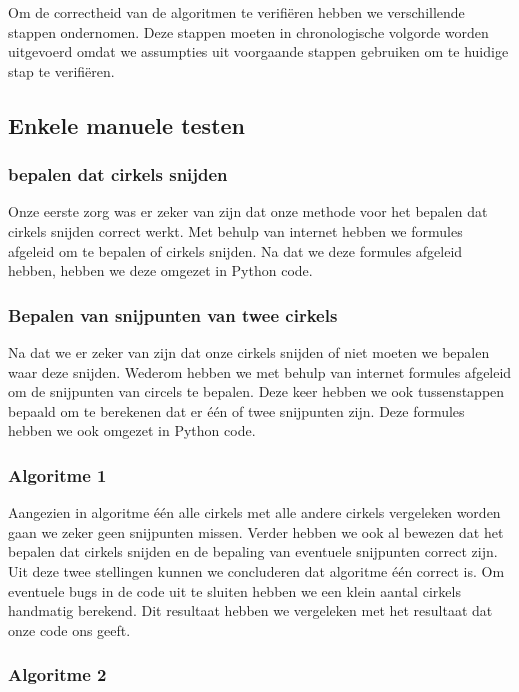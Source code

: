 \documentclass[11pt,a4paper]{article}
\begin{document}
Om de correctheid van de algoritmen te verifi\"eren hebben we verschillende stappen ondernomen. Deze stappen moeten in chronologische volgorde worden uitgevoerd omdat we assumpties uit voorgaande stappen gebruiken om te huidige stap te verifi\"eren.

\subsection{Enkele manuele testen}

\subsubsection*{bepalen dat cirkels snijden}
Onze eerste zorg was er zeker van zijn dat onze methode voor het bepalen dat cirkels snijden correct werkt. Met behulp van internet hebben we formules afgeleid om te bepalen of cirkels snijden. Na dat we deze formules afgeleid hebben, hebben we deze omgezet in Python code.

\subsubsection*{Bepalen van snijpunten van twee cirkels}
Na dat we er zeker van zijn dat onze cirkels snijden of niet moeten we bepalen waar deze snijden. Wederom hebben we met behulp van internet formules afgeleid om de snijpunten van circels te bepalen. Deze keer hebben we ook tussenstappen bepaald om te berekenen dat er \'e\'en of twee snijpunten zijn. Deze formules hebben we ook omgezet in Python code.

\subsubsection*{Algoritme 1}

Aangezien in algoritme \'e\'en alle cirkels met alle andere cirkels vergeleken worden gaan we zeker geen snijpunten missen. Verder hebben we ook al bewezen dat het bepalen dat cirkels snijden en de bepaling van eventuele snijpunten correct zijn. Uit deze twee stellingen kunnen we concluderen dat algoritme \'e\'en correct is.
Om eventuele bugs in de code uit te sluiten hebben we een klein aantal cirkels handmatig berekend. Dit resultaat hebben we vergeleken met het resultaat dat onze code ons geeft.

\subsubsection*{Algoritme 2}
\end{document}
